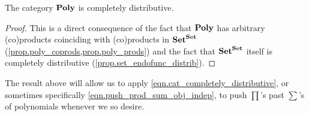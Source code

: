 \documentclass[Book-Poly]{subfiles}
\begin{document}
\begin{corollary} \label{prop.poly_completely_distributive}
The category $\mathbf{Poly}$ is completely distributive.
\end{corollary}
\begin{proof}
This is a direct consequence of the fact that $\mathbf{Poly}$ has arbitrary (co)products coinciding with (co)products in $\mathbf{Set}^{\mathbf{Set}}$ (\cref{prop.poly_coprods,prop.poly_prods}) and the fact that $\mathbf{Set}^{\mathbf{Set}}$ itself is completely distributive (\cref{prop.set_endofunc_distrib}).
\end{proof}

The result above will allow us to apply \eqref{eqn.cat_completely_distributive}, or sometimes specifically \eqref{eqn.push_prod_sum_obj_indep}, to push $\prod$'s past $\sum$'s of polynomials whenever we so desire.
\end{document}
